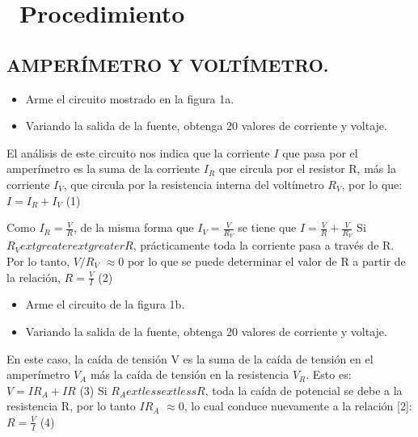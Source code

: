 \documentclass[11pt,a4paper]{article}
\newcommand{\iconotexto}[2]{\textcolor{cyanNeon}{\faIcon{#1}}~#2}
\begin{document}
\section{\iconotexto{list-ol}{Procedimiento}}

\subsection*{AMPERÍMETRO Y VOLTÍMETRO.}

\begin{itemize}[leftmargin=1.4em,itemsep=2pt,topsep=3pt]
  \item Arme el circuito mostrado en la figura 1a.
  \item Variando la salida de la fuente, obtenga 20 valores de corriente y voltaje.
\end{itemize}

El análisis de este circuito nos indica que la corriente $I$ que pasa por el amperímetro es la suma de la corriente $I_R$ que circula por el resistor R, más la corriente $I_V$, que circula por la resistencia interna del voltímetro $R_V$, por lo que: $I = I_R + I_V$ (1)

Como $I_R = \frac{V}{R}$, de la misma forma que $I_V = \frac{V}{R_V}$ se tiene que $I = \frac{V}{R} + \frac{V}{R_V}$ Si $R_V 	extgreater{}	extgreater{} R$, prácticamente toda la corriente pasa a través de R. Por lo tanto, $V/R_V$ $\approx 0$ por lo que se puede determinar el valor de R a partir de la relación, $R = \frac{V}{I}$ (2)

\begin{itemize}[leftmargin=1.4em,itemsep=2pt,topsep=3pt]
  \item Arme el circuito de la figura 1b.
  \item Variando la salida de la fuente, obtenga 20 valores de corriente y voltaje.
\end{itemize}

En este caso, la caída de tensión V es la suma de la caída de tensión en el amperímetro $V_A$ más la caída de tensión en la resistencia $V_R$. Esto es: $V = IR_A + IR$ (3) Si $R_A 	extless{}	extless{} R$, toda la caída de potencial se debe a la resistencia R, por lo tanto $IR_A$ $\approx 0$, lo cual conduce nuevamente a la relación [2]: $R = \frac{V}{I}$ (4)
\end{document}
